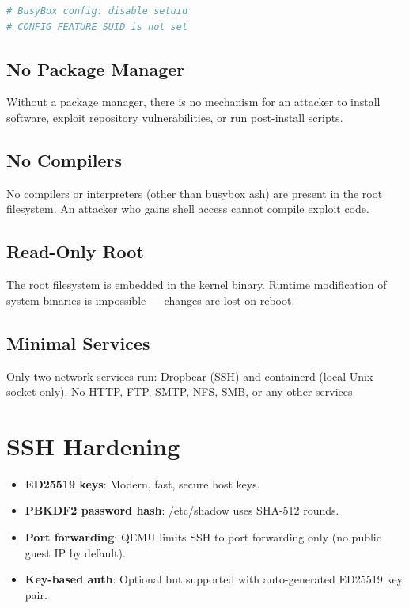 \begin{lstlisting}[language=bash]
# BusyBox config: disable setuid
# CONFIG_FEATURE_SUID is not set
\end{lstlisting}

\subsection{No Package Manager}

Without a package manager, there is no mechanism for an attacker to
install software, exploit repository vulnerabilities, or run
post-install scripts.

\subsection{No Compilers}

No compilers or interpreters (other than busybox ash) are present in the
root filesystem. An attacker who gains shell access cannot compile
exploit code.

\subsection{Read-Only Root}

The root filesystem is embedded in the kernel binary. Runtime modification
of system binaries is impossible — changes are lost on reboot.

\subsection{Minimal Services}

Only two network services run: Dropbear (SSH) and containerd (local Unix
socket only). No HTTP, FTP, SMTP, NFS, SMB, or any other services.

\section{SSH Hardening}

\begin{itemize}[nosep]
  \item \textbf{ED25519 keys}: Modern, fast, secure host keys.
  \item \textbf{PBKDF2 password hash}: /etc/shadow uses SHA-512 rounds.
  \item \textbf{Port forwarding}: QEMU limits SSH to port forwarding
        only (no public guest IP by default).
  \item \textbf{Key-based auth}: Optional but supported with auto-generated
        ED25519 key pair.
\end{itemize}

